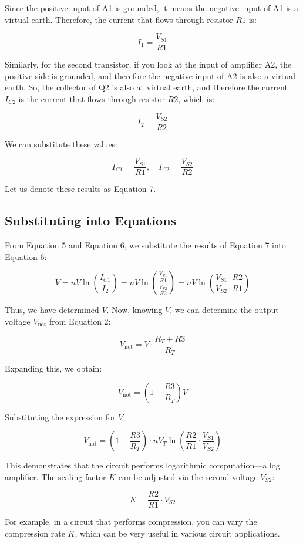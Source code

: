 Since the positive input of A1 is grounded, it means the negative input of A1 is a virtual earth. Therefore, the current that flows through resistor \( R1 \) is:

\[
I_1 = \frac{V_{S1}}{R1}
\]

Similarly, for the second transistor, if you look at the input of amplifier A2, the positive side is grounded, and therefore the negative input of A2 is also a virtual earth. So, the collector of Q2 is also at virtual earth, and therefore the current \( I_{C2} \) is the current that flows through resistor \( R2 \), which is:

\[
I_2 = \frac{V_{S2}}{R2}
\]

We can substitute these values:

\[
I_{C1} = \frac{V_{S1}}{R1}, \quad I_{C2} = \frac{V_{S2}}{R2}
\]

Let us denote these results as Equation 7.

\subsection*{Substituting into Equations}

From Equation 5 and Equation 6, we substitute the results of Equation 7 into Equation 6:

\[
V = n V \ln\left(\frac{I_{C1}}{I_2}\right) = n V \ln\left(\frac{\frac{V_{S1}}{R1}}{\frac{V_{S2}}{R2}}\right) = n V \ln\left(\frac{V_{S1} \cdot R2}{V_{S2} \cdot R1}\right)
\]

Thus, we have determined \( V \). Now, knowing \( V \), we can determine the output voltage \( V_{\text{not}} \) from Equation 2:

\[
V_{\text{not}} = V \cdot \frac{R_T + R3}{R_T}
\]

Expanding this, we obtain:

\[
V_{\text{not}} = \left(1 + \frac{R3}{R_T}\right) V
\]

Substituting the expression for \( V \):

\[
V_{\text{not}} = \left(1 + \frac{R3}{R_T}\right) \cdot n V_T \ln\left(\frac{R2}{R1} \cdot \frac{V_{S1}}{V_{S2}}\right)
\]

This demonstrates that the circuit performs logarithmic computation—a log amplifier. The scaling factor \( K \) can be adjusted via the second voltage \( V_{S2} \):

\[
K = \frac{R2}{R1} \cdot V_{S2}
\]

For example, in a circuit that performs compression, you can vary the compression rate \( K \), which can be very useful in various circuit applications.

